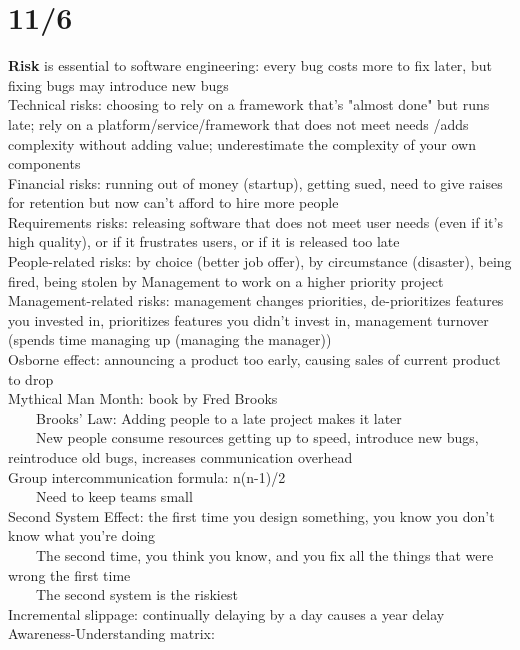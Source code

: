 \documentclass[10pt,letterpaper,unboxed,cm]{article}
\newcommand{\tab}{~~~~}
\begin{document}
\section{11/6}
\textbf{Risk} is essential to software engineering: every bug costs more to fix later, but fixing bugs may introduce new bugs\\
Technical risks: choosing to rely on a framework that's "almost done" but runs late; rely on a platform/service/framework that does not meet needs
/adds complexity without adding value; underestimate the complexity of your own components\\
Financial risks: running out of money (startup), getting sued, need to give raises for retention but now can't afford to hire more people\\
Requirements risks: releasing software that does not meet user needs (even if it's high quality), or if it frustrates users, or if it is released too late\\
People-related risks: by choice (better job offer), by circumstance (disaster), being fired, being stolen by Management to work on a higher priority project\\
Management-related risks: management changes priorities, de-prioritizes features you invested in, prioritizes features you didn't invest in, management turnover (spends time managing up (managing the manager))\\
Osborne effect: announcing a product too early, causing sales of current product to drop\\
Mythical Man Month: book by Fred Brooks\\
\tab Brooks' Law: Adding people to a late project makes it later\\
\tab New people consume resources getting up to speed, introduce new bugs, reintroduce old bugs, increases communication overhead\\
Group intercommunication formula: n(n-1)/2\\
\tab Need to keep teams small\\
Second System Effect: the first time you design something, you know you don't know what you're doing\\
\tab The second time, you think you know, and you fix all the things that were wrong the first time\\
\tab The second system is the riskiest\\
Incremental slippage: continually delaying by a day causes a year delay\\
Awareness-Understanding matrix: \\
\end{document}
